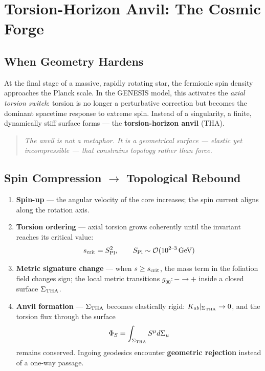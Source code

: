 \documentclass{article}
\newcommand{\Splanck}{S_{\mathrm{Pl}}}
\begin{document}

\section{Torsion-Horizon Anvil: The Cosmic Forge}
\label{sec:THF-intro}

\subsection{When Geometry Hardens}
\label{subsec:THF-hardening}

At the final stage of a massive, rapidly rotating star, the fermionic spin density approaches the Planck scale.
In the GENESIS model, this activates the \emph{axial torsion switch}: torsion is no longer a perturbative correction but becomes the dominant spacetime response to extreme spin.
Instead of a singularity, a finite, dynamically stiff surface forms --- the \textbf{torsion-horizon anvil} (THA).

\begin{quotation}
\emph{The anvil is not a metaphor. It is a geometrical surface --- elastic yet incompressible --- that constrains topology rather than force.}
\end{quotation}

\subsection{Spin Compression \texorpdfstring{$\!\rightarrow$}{->} Topological Rebound}
\label{subsec:THF-bounce}

\begin{enumerate}[label=\textbf{Step \arabic*}, wide]
  \item \textbf{Spin-up} --- the angular velocity of the core increases; the spin current aligns along the rotation axis.
  \item \textbf{Torsion ordering} --- axial torsion grows coherently until the invariant reaches its critical value:
  \begin{equation}
s_{\rm crit} = \Splanck^2,
\qquad
\Splanck \sim \mathcal{O}(10^{2\text{--}3}\,\mathrm{GeV})
\label{eq:THF-scrit}
\end{equation}

  \item \textbf{Metric signature change} --- when $s \geq s_{\rm crit}$, the mass term in the foliation field changes sign; the local metric transitions $g_{00}\!: - \rightarrow +$ inside a closed surface $\Sigma_{\rm THA}$.
  \item \textbf{Anvil formation} --- $\Sigma_{\rm THA}$ becomes elastically rigid: $K_{ab}|_{\Sigma_{\rm THA}} \rightarrow 0$, and the torsion flux through the surface
  \begin{equation}
    \Phi_{S} = \int_{\Sigma_{\rm THA}} S^{\mu} d\Sigma_{\mu}
  \end{equation}
  remains conserved. Ingoing geodesics encounter \textbf{geometric rejection} instead of a one-way passage.
\end{enumerate}
\end{document}
